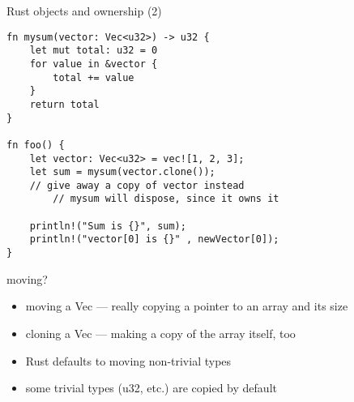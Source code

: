 \begin{frame}[fragile,label=rustOwnership2]{Rust objects and ownership (2)}
    \begin{verbatim}
fn mysum(vector: Vec<u32>) -> u32 {
    let mut total: u32 = 0
    for value in &vector {
        total += value
    }
    return total
}

fn foo() {
    let vector: Vec<u32> = vec![1, 2, 3];
    let sum = mysum(vector.clone());
    // give away a copy of vector instead
        // mysum will dispose, since it owns it
    
    println!("Sum is {}", sum);
    println!("vector[0] is {}" , newVector[0]);
}
\end{verbatim}
\end{frame}

\begin{frame}{moving?}
    \begin{itemize}
    \item moving a Vec --- really copying a pointer to an array and its size
    \item cloning a Vec --- making a copy of the array itself, too
    \vspace{.5cm}
    \item Rust defaults to moving non-trivial types
    \item some trivial types (u32, etc.) are copied by default
    \end{itemize}
\end{frame}

